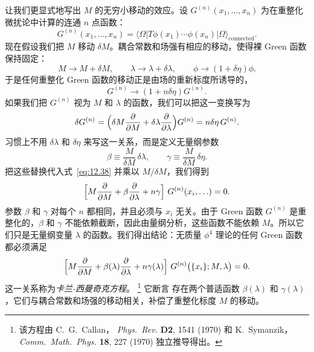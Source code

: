 让我们更显式地写出 $M$ 的无穷小移动的效应。设 $G^{(n)}(x_1, \ldots, x_n)$ 为在重整化微扰论中计算的连通 $n$ 点函数：
\begin{equation}
  G^{(n)}(x_1, \ldots, x_n) = \langle\Omega|T\phi(x_1)\cdots\phi(x_n)
    |\Omega\rangle_{\mathrm{connected}} .
  \label{eq:12.36}
\end{equation}
现在假设我们把 $M$ 移动 $\delta M$。耦合常数和场强有相应的移动，使得裸 Green 函数保持固定：
\begin{equation}
  M \to M + \delta M,\qquad \lambda \to \lambda + \delta\lambda,\qquad
  \phi \to (1+\delta\eta)\phi .
  \label{eq:12.37}
\end{equation}
于是任何重整化 Green 函数的移动正是由场的重新标度所诱导的，
\begin{equation}
  G^{(n)} \to (1+n\delta\eta)G^{(n)} .
\end{equation}
如果我们把 $G^{(n)}$ 视为 $M$ 和 $\lambda$ 的函数，我们可以把这一变换写为
\begin{equation}
  \delta G^{(n)} = \Bigl( \delta M\frac{\partial}{\partial M}
    + \delta\lambda\frac{\partial}{\partial\lambda} \Bigr)G^{(n)}
  = n\delta\eta\,G^{(n)} .
  \label{eq:12.38}
\end{equation}
习惯上不用 $\delta\lambda$ 和 $\delta\eta$ 来写这一关系，而是定义无量纲参数
\begin{equation}
  \beta \equiv \frac{M}{\delta M}\,\delta\lambda,\qquad
  \gamma \equiv \frac{M}{\delta M}\,\delta\eta .
  \label{eq:12.39}
\end{equation}
把这些替换代入式~\eqref{eq:12.38} 并乘以 $M/\delta M$，我们得到
\begin{equation}
  \Bigl[ M\frac{\partial}{\partial M} + \beta\frac{\partial}{\partial\lambda}
    + n\gamma \Bigr]\ G^{(n)}(x_i, \ldots) = 0 .
  \label{eq:12.40}
\end{equation}
参数 $\beta$ 和 $\gamma$ 对每个 $n$ 都相同，并且必须与 $x_i$ 无关。由于 Green 函数 $G^{(n)}$ 是重整化的，$\beta$ 和 $\gamma$ 不能依赖截断，因此由量纲分析，这些函数不能依赖 $M$。所以它们只是无量纲变量 $\lambda$ 的函数。我们得出结论：无质量 $\phi^4$ 理论的任何 Green 函数都必须满足
\begin{equation}
  \Bigl[ M\frac{\partial}{\partial M} + \beta(\lambda)\frac{\partial}
    {\partial\lambda} + n\gamma(\lambda) \Bigr]\ G^{(n)}\bigl( \{x_i\}; M,
      \lambda \bigr) = 0 .
  \label{eq:12.41}
\end{equation}
这一关系称为\emph{卡兰-西曼奇克方程}。%
\footnote{该方程由 C.~G.~Callan，
\emph{Phys.\ Rev.} \textbf{D2}, 1541 (1970) 和 K.~Symanzik，
\emph{Comm.\ Math.\ Phys.} \textbf{18}, 227 (1970) 独立推导得出。} 它断言
存在两个普适函数 $\beta(\lambda)$ 和 $\gamma(\lambda)$，它们与耦合常数和场强的移动相关，补偿了重整化标度 $M$ 的移动。

